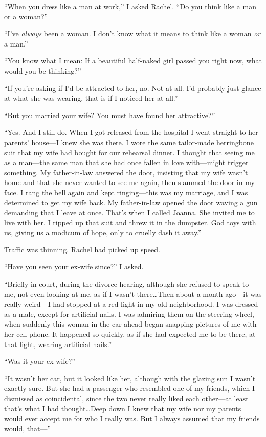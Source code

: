``When you dress like a man at work,'' I asked Rachel. ``Do you think
like a man or a woman?''

``I've \emph{always} been a woman. I don't know what it means to think
like a woman \emph{or} a man.''

``You know what I mean: If a beautiful half-naked girl passed you right
now, what would you be thinking?''

``If you're asking if I'd be attracted to her, no. Not at all. I'd
probably just glance at what she was wearing, that is if I noticed her
at all.''

``But you married your wife? You must have found her attractive?''

``Yes. And I still do. When I got released from the hospital I went
straight to her parents' house---I knew she was there. I wore the same
tailor-made herringbone suit that my wife had bought for our rehearsal
dinner. I thought that seeing me as a man---the same man that she had
once fallen in love with---might trigger something. My father-in-law
answered the door, insisting that my wife wasn't home and that she never
wanted to see me again, then slammed the door in my face. I rang the
bell again and kept ringing---this was my marriage, and I was determined
to get my wife back. My father-in-law opened the door waving a gun
demanding that I leave at once. That's when I called Joanna. She invited
me to live with her. I ripped up that suit and threw it in the dumpster.
God toys with us, giving us a modicum of hope, only to cruelly dash it
away.''

Traffic was thinning. Rachel had picked up speed.

``Have you seen your ex-wife since?'' I asked.

``Briefly in court, during the divorce hearing, although she refused to
speak to me, not even looking at me, as if I wasn't there\ldots Then
about a month ago---it was really weird---I had stopped at a red light
in my old neighborhood. I was dressed as a male, except for artificial
nails. I was admiring them on the steering wheel, when suddenly this
woman in the car ahead began snapping pictures of me with her cell
phone. It happened so quickly, as if she had expected me to be there, at
that light, wearing artificial nails.''

``Was it your ex-wife?''

``It wasn't her car, but it looked like her, although with the glazing
sun I wasn't exactly sure. But she had a passenger who resembled one of
my friends, which I dismissed as coincidental, since the two never
really liked each other---at least that's what I had thought\ldots Deep
down I knew that my wife nor my parents would ever accept me for who I
really was. But I always assumed that my friends would, that---''

